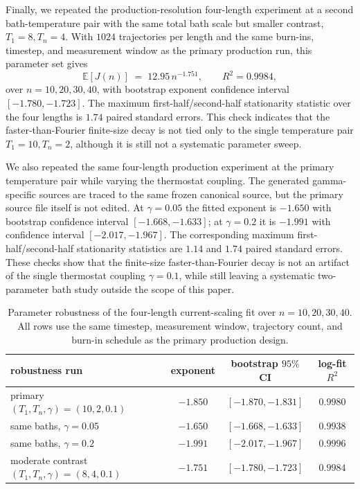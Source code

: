 \documentclass[11pt,a4paper]{article}
\theoremstyle{definition}
\newcommand{\E}{\mathbb{E}}
\numberwithin{equation}{section}   %
\begin{document}
Finally, we repeated the production-resolution four-length experiment at a
second bath-temperature pair with the same total bath scale but smaller
contrast, $T_1=8,T_n=4$.  With $1024$ trajectories per length and the same
burn-ins, timestep, and measurement window as the primary production run, this
parameter set gives
\[
  \E[J(n)] \;=\; 12.95\,n^{-1.751},
  \qquad R^2=0.9984,
\]
over $n=10,20,30,40$, with bootstrap exponent confidence interval
$[-1.780,-1.723]$.  The maximum first-half/second-half stationarity statistic
over the four lengths is $1.74$ paired standard errors.  This check indicates
that the faster-than-Fourier finite-size decay is not tied only to the single
temperature pair $T_1=10,T_n=2$, although it is still not a systematic
parameter sweep.

We also repeated the same four-length production experiment at the primary
temperature pair while varying the thermostat coupling.  The generated
gamma-specific sources are traced to the same frozen canonical source, but the
primary source file itself is not edited.  At $\gamma=0.05$ the fitted exponent
is $-1.650$ with bootstrap confidence interval $[-1.668,-1.633]$; at
$\gamma=0.2$ it is $-1.991$ with confidence interval
$[-2.017,-1.967]$.  The corresponding maximum first-half/second-half
stationarity statistics are $1.14$ and $1.74$ paired standard errors.  These
checks show that the finite-size faster-than-Fourier decay is not an artifact
of the single thermostat coupling $\gamma=0.1$, while still leaving a
systematic two-parameter bath study outside the scope of this paper.

\begin{table}[ht]\centering
\small
\begin{tabular}{lccc}
\toprule
robustness run & exponent & bootstrap $95\%$ CI & log-fit $R^2$ \\
\midrule
primary $(T_1,T_n,\gamma)=(10,2,0.1)$ & $-1.850$ & $[-1.870,-1.831]$ & $0.9980$ \\
same baths, $\gamma=0.05$ & $-1.650$ & $[-1.668,-1.633]$ & $0.9938$ \\
same baths, $\gamma=0.2$ & $-1.991$ & $[-2.017,-1.967]$ & $0.9996$ \\
moderate contrast $(T_1,T_n,\gamma)=(8,4,0.1)$ & $-1.751$ & $[-1.780,-1.723]$ & $0.9984$ \\
\bottomrule
\end{tabular}
\caption{Parameter robustness of the four-length current-scaling fit over
$n=10,20,30,40$.  All rows use the same timestep, measurement window,
trajectory count, and burn-in schedule as the primary production design.}
\label{tab:parameter-robustness}
\end{table}
\end{document}
